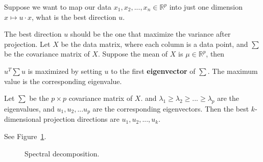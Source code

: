  Suppose we want to map our data $x_1, x_2, ..., x_n \in 
\mathbb{R}^p$ into just one dimension $x \mapsto u \cdot x$, what is the best direction $u$.

The best direction $u$ should be the one that maximize the variance after projection. Let $X$
be the data matrix, where each column is a data point, and $\sum$ be the covariance matrix of $X$. 
Suppose the mean of $X$ is $\mu \in \mathbb{R}^p$, then 

\begin{remark}
    $u^T\sum u$ is maximized by setting $u$ to the first \textbf{eigenvector} of $\sum$. The maximum
    value is the corresponding eigenvalue.
\end{remark}


 Let $\sum$ be the $p\times p$ covariance matrix of $X$. 
and $\lambda_1 \geq  \lambda_2 \geq ... \geq \lambda_p$ are the eigenvalues, and $u_1, u_2, ...
u_p$ are the corresponding eigenvectors. Then the best $k$-dimensional projection directions are
$u_1, u_2, ..., u_k$.


 See Figure~\ref{fig:spec_decomp_mar}.
\begin{figure}[H]
    \caption{Spectral decomposition.}
    \label{fig:spec_decomp_mar}
\end{figure}

